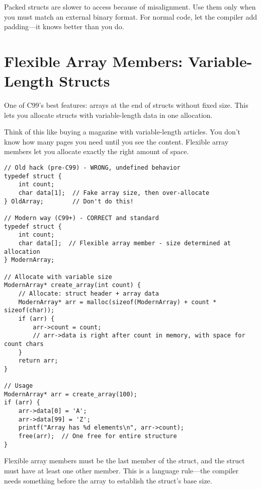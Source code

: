 \begin{warningbox}
Packed structs are slower to access because of misalignment. Use them only when you must match an external binary format. For normal code, let the compiler add padding---it knows better than you do.
\end{warningbox}

\section{Flexible Array Members: Variable-Length Structs}

One of C99's best features: arrays at the end of structs without fixed size. This lets you allocate structs with variable-length data in one allocation.

Think of this like buying a magazine with variable-length articles. You don't know how many pages you need until you see the content. Flexible array members let you allocate exactly the right amount of space.

\begin{lstlisting}
// Old hack (pre-C99) - WRONG, undefined behavior
typedef struct {
    int count;
    char data[1];  // Fake array size, then over-allocate
} OldArray;        // Don't do this!

// Modern way (C99+) - CORRECT and standard
typedef struct {
    int count;
    char data[];  // Flexible array member - size determined at allocation
} ModernArray;

// Allocate with variable size
ModernArray* create_array(int count) {
    // Allocate: struct header + array data
    ModernArray* arr = malloc(sizeof(ModernArray) + count * sizeof(char));
    if (arr) {
        arr->count = count;
        // arr->data is right after count in memory, with space for count chars
    }
    return arr;
}

// Usage
ModernArray* arr = create_array(100);
if (arr) {
    arr->data[0] = 'A';
    arr->data[99] = 'Z';
    printf("Array has %d elements\n", arr->count);
    free(arr);  // One free for entire structure
}
\end{lstlisting}

\begin{notebox}
Flexible array members must be the last member of the struct, and the struct must have at least one other member. This is a language rule---the compiler needs something before the array to establish the struct's base size.
\end{notebox}

